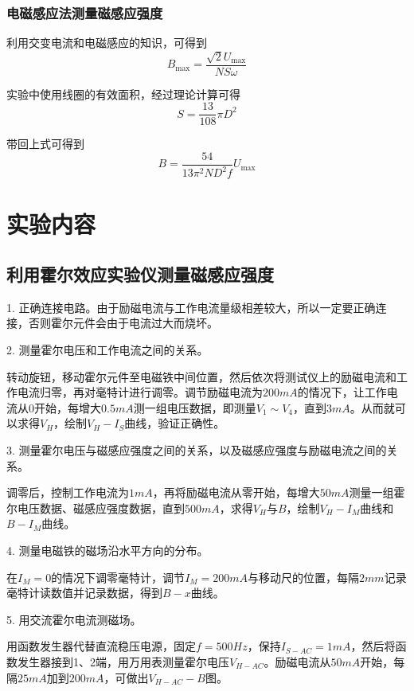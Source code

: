\documentclass[11pt]{article}
\begin{document}
\subsubsection{电磁感应法测量磁感应强度}

利用交变电流和电磁感应的知识，可得到\begin{displaymath}B_{\max}=\frac{\sqrt{2}U_{\max}}{NS\omega}\end{displaymath}

实验中使用线圈的有效面积，经过理论计算可得\begin{displaymath}S=\frac{13}{108}\pi D^2\end{displaymath}

带回上式可得到\begin{displaymath}B = \frac{54}{13 \pi^2 N D^2 f} U_{\max}\end{displaymath}

\section{实验内容}

\subsection{利用霍尔效应实验仪测量磁感应强度}

1. 正确连接电路。由于励磁电流与工作电流量级相差较大，所以一定要正确连接，否则霍尔元件会由于电流过大而烧坏。

2. 测量霍尔电压和工作电流之间的关系。

转动旋钮，移动霍尔元件至电磁铁中间位置，然后依次将测试仪上的励磁电流和工作电流归零，再对毫特计进行调零。调节励磁电流为$200mA$的情况下，让工作电流从$0$开始，每增大$0.5mA$测一组电压数据，即测量$V_1\sim V_4$，直到$3mA$。从而就可以求得$V_H$，绘制$V_H - I_S$曲线，验证正确性。

3. 测量霍尔电压与磁感应强度之间的关系，以及磁感应强度与励磁电流之间的关系。

调零后，控制工作电流为$1mA$，再将励磁电流从零开始，每增大$50mA$测量一组霍尔电压数据、磁感应强度数据，直到$500mA$，求得$V_H$与$B$，绘制$V_H - I_M$曲线和$B - I_M$曲线。

4. 测量电磁铁的磁场沿水平方向的分布。

在$I_M=0$的情况下调零毫特计，调节$I_M=200mA$与移动尺的位置，每隔$2mm$记录毫特计读数值并记录数据，得到$B - x$曲线。

5. 用交流霍尔电流测磁场。

用函数发生器代替直流稳压电源，固定$f=500Hz$，保持$I_{S-AC}=1mA$，然后将函数发生器接到1、2端，用万用表测量霍尔电压$V_{H-AC}$。励磁电流从$50mA$开始，每隔$25mA$加到$200mA$，可做出$V_{H-AC} - B$图。
\end{document}
